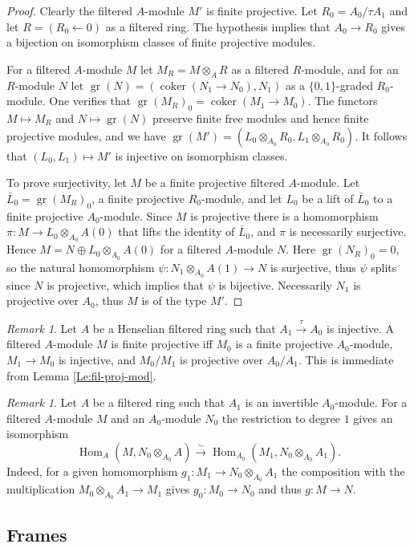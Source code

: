 \documentclass[a4paper,11pt]{amsart}
\theoremstyle{plain}
\theoremstyle{definition}
\theoremstyle{remark}
\newtheorem{Remark}[equation]{Remark}
\newcommand{\bRe}{\begin{Remark}}
\newcommand{\eRe}{\end{Remark}}
\newcommand{\bproof}{\begin{proof}}
\newcommand{\eproof}{\end{proof}}
\numberwithin{equation}{section}
\DeclareMathOperator{\coker}{coker}
\DeclareMathOperator{\gr}{gr}
\DeclareMathOperator{\Hom}{Hom}
\begin{document}
\bproof
Clearly the filtered $A$-module $M'$ is finite projective. Let $R_0=A_0/\tau A_1$ and let $R=(R_0\leftarrow 0)$ as a filtered ring. The hypothesis implies that $A_0\to R_0$ gives a bijection on isomorphism classes of finite projective modules. 

For a filtered $A$-module $M$ let $M_R=M\otimes_AR$ as a filtered  $R$-module, and for an $R$-module $N$ let $\gr(N)=(\coker(N_1\to N_0),N_1)$ as a $\{0,1\}$-graded $R_0$-module. One verifies that $\gr(M_R)_0=\coker(M_1\to M_0)$. The functors $M\mapsto M_R$ and $N\mapsto\gr(N)$ preserve finite free modules and hence finite projective modules, and we have $\gr(M')=(L_0\otimes_{A_0}R_0,L_1\otimes_{A_0}R_0)$. It follows that $(L_0,L_1)\mapsto M'$ is injective on isomorphism classes. 

To prove surjectivity, let $M$ be a finite projective filtered $A$-module. Let $\bar L_0=\gr(M_R)_0$, a finite projective $R_0$-module, and let $L_0$ be a lift of $\bar L_0$ to a finite projective $A_0$-module. Since $M$ is projective there is a homomorphism $\pi\colon M\to L_0\otimes_{A_0}A(0)$ that lifts the identity of $\bar L_0$, and $\pi$ is necessarily surjective. Hence $M=N\oplus L_0\otimes_{A_0}A(0)$ for a filtered  $A$-module $N$. Here $\gr(N_R)_0=0$, so the natural homomorphism $\psi\colon N_1\otimes_{A_0}A(1)\to N$ is surjective, thus $\psi$ splits since $N$ is projective, which implies that $\psi$ is bijective. Necessarily $N_1$ is projective over $A_0$, thus $M$ is of the type $M'$. 
\eproof

\bRe
\label{Re:fil-proj-mod-ideal}
Let $A$ be a Henselian filtered ring such that $A_1\xrightarrow\tau A_0$ is injective. A filtered $A$-module $M$ is finite projective iff $M_0$ is a finite projective $A_0$-module, $M_1\to M_0$ is injective, and $M_0/M_1$ is projective over $A_0/A_1$. This is immediate from Lemma \ref{Le:fil-proj-mod}.
\eRe

\bRe
\label{Re:graded-hom-deg-1}
Let $A$ be a filtered ring such that $A_1$ is an invertible $A_0$-module. For a filtered $A$-module $M$ and an $A_0$-module $N_0$ the restriction to degree $1$ gives an isomorphism
\[
\Hom_{A}(M,N_0\otimes_{A_0}A)\xrightarrow\sim\Hom_{A_0}(M_1,N_0\otimes_{A_0}A_1).
\]
Indeed, for a given homomorphism $g_1\colon M_1\to N_0\otimes_{A_0}A_1$ the composition with the multiplication $M_0\otimes_{A_0}A_1\to M_1$ gives $g_0\colon M_0\to N_0$ and thus $g\colon M\to N$.
\eRe

\subsection{Frames}
\end{document}
